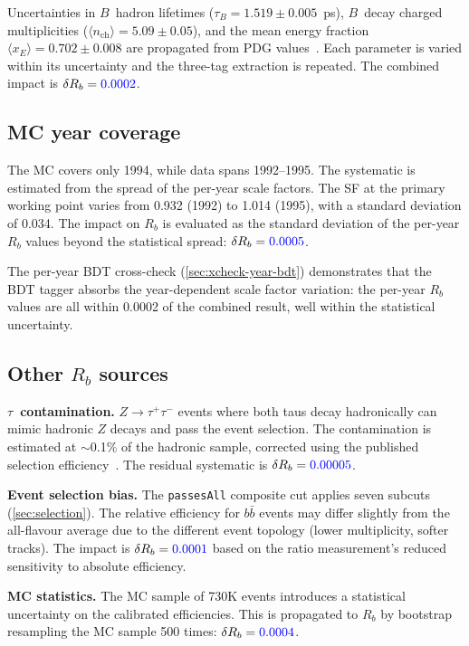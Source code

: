 \documentclass[11pt,a4paper]{article}
\newcommand{\measured}[1]{\textcolor{blue}{#1}}
\begin{document}
Uncertainties in $B$~hadron lifetimes ($\tau_B = 1.519 \pm 0.005$~ps),
$B$~decay charged multiplicities ($\langle n_\mathrm{ch} \rangle =
5.09 \pm 0.05$), and the mean energy fraction
$\langle x_E \rangle = 0.702 \pm 0.008$ are propagated from PDG
values~\cite{PDG:2024}.  Each parameter is varied within its uncertainty
and the three-tag extraction is repeated.  The combined impact is
$\delta R_b = \measured{0.0002}$.

\subsection{MC year coverage}
\label{sec:syst-mc-year}

The MC covers only 1994, while data spans 1992--1995.  The systematic is
estimated from the spread of the per-year scale factors.  The SF at the
primary working point varies from 0.932 (1992) to 1.014 (1995), with
a standard deviation of 0.034.  The impact on $R_b$ is evaluated as
the standard deviation of the per-year $R_b$ values beyond the
statistical spread: $\delta R_b = \measured{0.0005}$.

The per-year BDT cross-check (\cref{sec:xcheck-year-bdt}) demonstrates
that the BDT tagger absorbs the year-dependent scale factor variation:
the per-year $R_b$ values are all within 0.0002 of the combined result,
well within the statistical uncertainty.

\subsection{Other $R_b$ sources}

\textbf{$\tau$~contamination.}
$Z \to \tau^+\tau^-$ events where both taus decay hadronically can mimic
hadronic $Z$ decays and pass the event selection.  The contamination is
estimated at $\sim$0.1\% of the hadronic sample, corrected using the
published selection efficiency~\cite{ALEPH:sigma_had}.  The residual
systematic is $\delta R_b = \measured{0.00005}$.

\textbf{Event selection bias.}
The \texttt{passesAll} composite cut applies seven subcuts
(\cref{sec:selection}).  The relative efficiency for $b\bar{b}$ events
may differ slightly from the all-flavour average due to the different
event topology (lower multiplicity, softer tracks).  The impact is
$\delta R_b = \measured{0.0001}$ based on the ratio measurement's
reduced sensitivity to absolute efficiency.

\textbf{MC statistics.}
The MC sample of 730K events introduces a statistical uncertainty on the
calibrated efficiencies.  This is propagated to $R_b$ by bootstrap
resampling the MC sample 500 times:
$\delta R_b = \measured{0.0004}$.
\end{document}
